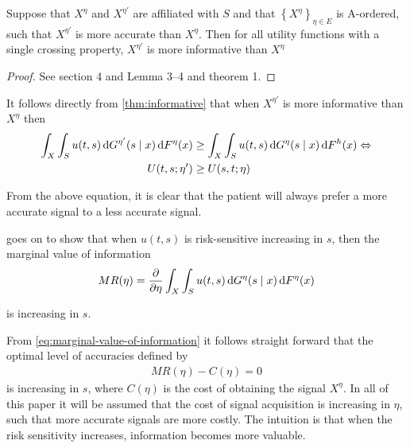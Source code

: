 \begin{theorem}\label{thm:informative}
\parencite{Persico2000Information}
Suppose that $X^{\eta}$ and $X^{\eta'}$ are affiliated with $S$ and that $\left \{X^{\eta}\right \} _{\eta\in E}$ is A-ordered, such that $X^{\eta'}$ is more accurate than $X^{\eta}$. Then for all utility functions with a single crossing property, $X^{\eta'}$ is more informative than $X^{\eta}$
\end{theorem}
\begin{proof}
See \citet{Lehmann1988Comparing} section 4 and \citet{Karlin1956Theory} Lemma 3--4 and theorem 1.
\end{proof}

It follows directly from \cref{thm:informative} that when $X^{\eta'}$ is more informative than $X^{\eta}$  then
\begin{align}
	\label{eq:utility-increasing-information}
	\begin{split}
	\int_{X}\int_{S}u(t,s)\dif G^{\eta'}(s\mid x)\dif F^\eta(x)&\geq \int_{X}\int_{S}u(t,s)\dif G^{\eta}(s\mid x)\dif F^h(x) \Leftrightarrow \\
	U(t,s;\eta')&\geq U(s,t;\eta)
\end{split}
\end{align}

From the above equation, it is clear that the patient will always prefer a more accurate signal to a less accurate signal.

\textcite{Persico2000Information} goes on to show that when $u(t,s)$ is risk-sensitive increasing in $s$, then the marginal value of information
\begin{align}
		MR(\eta)=\frac{\partial}{\partial \eta} \int_{X}\int_{S}u(t,s)\dif G^{\eta}(s\mid x)\dif F^\eta(x) \label{eq:marginal-value-of-information}
\end{align}

is increasing in $s$.

From \cref{eq:marginal-value-of-information} it follows straight forward that the optimal level of accuracies defined by
\begin{align}
	MR(\eta)-C(\eta)=0
\end{align}
 is increasing in $s$, where $C(\eta)$ is the cost of obtaining the signal $X^\eta$. In all of this paper it will be assumed that the cost of signal acquisition is increasing in $\eta$, such that more accurate signals are more costly. The intuition is that when the risk sensitivity increases, information becomes more valuable.


